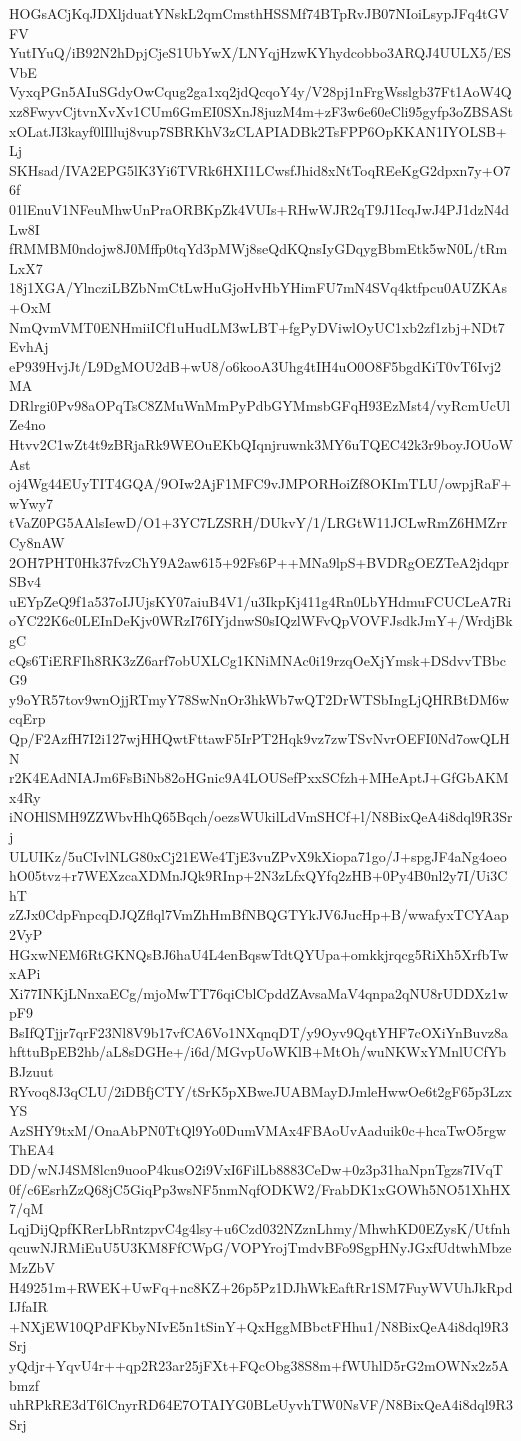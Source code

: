 HOGsACjKqJDXljduatYNskL2qmCmsthHSSMf74BTpRvJB07NIoiLsypJFq4tGVFV
YutIYuQ/iB92N2hDpjCjeS1UbYwX/LNYqjHzwKYhydcobbo3ARQJ4UULX5/ESVbE
VyxqPGn5AIuSGdyOwCqug2ga1xq2jdQcqoY4y/V28pj1nFrgWsslgb37Ft1AoW4Q
xz8FwyvCjtvnXvXv1CUm6GmEI0SXnJ8juzM4m+zF3w6e60eCli95gyfp3oZBSASt
xOLatJI3kayf0lIlluj8vup7SBRKhV3zCLAPIADBk2TsFPP6OpKKAN1IYOLSB+Lj
SKHsad/IVA2EPG5lK3Yi6TVRk6HXI1LCwsfJhid8xNtToqREeKgG2dpxn7y+O76f
01lEnuV1NFeuMhwUnPraORBKpZk4VUIs+RHwWJR2qT9J1IcqJwJ4PJ1dzN4dLw8I
fRMMBM0ndojw8J0Mffp0tqYd3pMWj8seQdKQnsIyGDqygBbmEtk5wN0L/tRmLxX7
18j1XGA/YlncziLBZbNmCtLwHuGjoHvHbYHimFU7mN4SVq4ktfpcu0AUZKAs+OxM
NmQvmVMT0ENHmiiICf1uHudLM3wLBT+fgPyDViwlOyUC1xb2zf1zbj+NDt7EvhAj
eP939HvjJt/L9DgMOU2dB+wU8/o6kooA3Uhg4tIH4uO0O8F5bgdKiT0vT6Ivj2MA
DRlrgi0Pv98aOPqTsC8ZMuWnMmPyPdbGYMmsbGFqH93EzMst4/vyRcmUcUlZe4no
Htvv2C1wZt4t9zBRjaRk9WEOuEKbQIqnjruwnk3MY6uTQEC42k3r9boyJOUoWAst
oj4Wg44EUyTIT4GQA/9OIw2AjF1MFC9vJMPORHoiZf8OKImTLU/owpjRaF+wYwy7
tVaZ0PG5AAlsIewD/O1+3YC7LZSRH/DUkvY/1/LRGtW11JCLwRmZ6HMZrrCy8nAW
2OH7PHT0Hk37fvzChY9A2aw615+92Fs6P++MNa9lpS+BVDRgOEZTeA2jdqprSBv4
uEYpZeQ9f1a537oIJUjsKY07aiuB4V1/u3IkpKj411g4Rn0LbYHdmuFCUCLeA7Ri
oYC22K6c0LEInDeKjv0WRzI76IYjdnwS0sIQzlWFvQpVOVFJsdkJmY+/WrdjBkgC
cQs6TiERFIh8RK3zZ6arf7obUXLCg1KNiMNAc0i19rzqOeXjYmsk+DSdvvTBbcG9
y9oYR57tov9wnOjjRTmyY78SwNnOr3hkWb7wQT2DrWTSbIngLjQHRBtDM6wcqErp
Qp/F2AzfH7I2i127wjHHQwtFttawF5IrPT2Hqk9vz7zwTSvNvrOEFI0Nd7owQLHN
r2K4EAdNIAJm6FsBiNb82oHGnic9A4LOUSefPxxSCfzh+MHeAptJ+GfGbAKMx4Ry
iNOHlSMH9ZZWbvHhQ65Bqch/oezsWUkilLdVmSHCf+l/N8BixQeA4i8dql9R3Srj
ULUIKz/5uCIvlNLG80xCj21EWe4TjE3vuZPvX9kXiopa71go/J+spgJF4aNg4oeo
hO05tvz+r7WEXzcaXDMnJQk9RInp+2N3zLfxQYfq2zHB+0Py4B0nl2y7I/Ui3ChT
zZJx0CdpFnpcqDJQZflql7VmZhHmBfNBQGTYkJV6JucHp+B/wwafyxTCYAap2VyP
HGxwNEM6RtGKNQsBJ6haU4L4enBqswTdtQYUpa+omkkjrqcg5RiXh5XrfbTwxAPi
Xi77INKjLNnxaECg/mjoMwTT76qiCblCpddZAvsaMaV4qnpa2qNU8rUDDXz1wpF9
BsIfQTjjr7qrF23Nl8V9b17vfCA6Vo1NXqnqDT/y9Oyv9QqtYHF7cOXiYnBuvz8a
hfttuBpEB2hb/aL8sDGHe+/i6d/MGvpUoWKlB+MtOh/wuNKWxYMnlUCfYbBJzuut
RYvoq8J3qCLU/2iDBfjCTY/tSrK5pXBweJUABMayDJmleHwwOe6t2gF65p3LzxYS
AzSHY9txM/OnaAbPN0TtQl9Yo0DumVMAx4FBAoUvAaduik0c+hcaTwO5rgwThEA4
DD/wNJ4SM8lcn9uooP4kusO2i9VxI6FilLb8883CeDw+0z3p31haNpnTgzs7IVqT
0f/c6EsrhZzQ68jC5GiqPp3wsNF5nmNqfODKW2/FrabDK1xGOWh5NO51XhHX7/qM
LqjDijQpfKRerLbRntzpvC4g4lsy+u6Czd032NZznLhmy/MhwhKD0EZysK/Utfnh
qcuwNJRMiEuU5U3KM8FfCWpG/VOPYrojTmdvBFo9SgpHNyJGxfUdtwhMbzeMzZbV
H49251m+RWEK+UwFq+nc8KZ+26p5Pz1DJhWkEaftRr1SM7FuyWVUhJkRpdIJfaIR
+NXjEW10QPdFKbyNIvE5n1tSinY+QxHggMBbctFHhu1/N8BixQeA4i8dql9R3Srj
yQdjr+YqvU4r++qp2R23ar25jFXt+FQcObg38S8m+fWUhlD5rG2mOWNx2z5Abmzf
uhRPkRE3dT6lCnyrRD64E7OTAIYG0BLeUyvhTW0NsVF/N8BixQeA4i8dql9R3Srj
